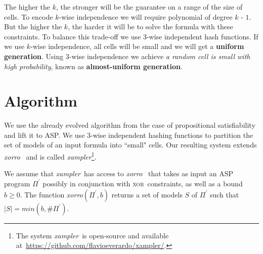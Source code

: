\documentclass{svproc}
\newcommand{\XOR}{\textsc{xor}} %
\newcommand{\fff}{\ensuremath{\Pi}\xspace}
\newcommand{\ep}{$\epsilon$\xspace}
\newcommand{\sysfont}{\textit}
\newcommand{\xorro}{\sysfont{xorro}}
\newcommand{\xampler}{\sysfont{xampler}}
\begin{document}

The higher the $k$, the stronger will be the guarantee on a range of the size of cells. 
%
To encode $k$-wise independence we will require polynomial of degree $k$ - $1$.
%
But the higher the $k$, the harder it will be to solve the formula with these constraints. 
%
To balance this trade-off we use 3-wise independent hash functions.
%
If we use $k$-wise independence, all cells will be small and we will get a \textbf{uniform generation}. 
%
Using $3$-wise independence we achieve \emph{a random cell is small with high probability}, known as \textbf{almost-uniform generation}.

\section{Algorithm} \label{approxasp}
We use the already evolved algorithm from the case of propositional satisfiability~\cite{ChakrabortyMV13} and lift it to ASP.
%
We use 3-wise independent hashing functions to partition the set of models of an input formula into ``small" cells.
%
Our resulting system extends \xorro~\cite{DBLP:conf/lpnmr/EverardoJKS19} and is called \xampler\footnote{The system \xampler\ is open-source and available at~\url{https://github.com/flavioeverardo/xampler/}.}.


We assume that \xampler\ has access to \xorro~\cite{DBLP:conf/lpnmr/EverardoJKS19} that takes as input an ASP program $\fff^{\prime}$ possibly in conjunction with \XOR\ constraints, as well as a bound $b\geq0$.
%
The function \xorro $(\fff^{\prime},b)$ returns a set of models $S$ of $\fff^{\prime}$ such that $|S| = min(b, \#\fff^{\prime})$.
%
\end{document}

